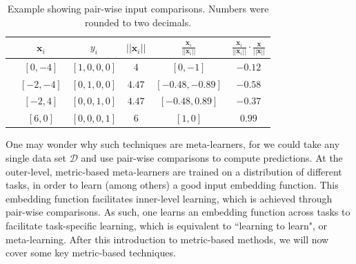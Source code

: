 \begin{table}[tb]
    \centering
    \begin{tabular}{cccccc}
    \toprule
         & $\boldsymbol{x}_{i}$ & $y_{i}$ & $||\boldsymbol{x}_{i}||$ & $\frac{\boldsymbol{x}_{i}}{||\boldsymbol{x}_{i}||}$ & $\frac{\boldsymbol{x}_{i}}{||\boldsymbol{x}_{i}||} \cdot \frac{\boldsymbol{x}}{||\boldsymbol{x}||}$\\
         \midrule
         & $[0,-4]$ & $[1,0,0,0]$ & $4$ & $[0,-1]$ & $-0.12$\\
         & $[-2,-4]$ & $[0,1,0,0]$ &$4.47$ & $[-0.48,-0.89]$ & $-0.58$\\
         & $[-2,4]$ & $[0,0,1,0]$ & $4.47$ & $[-0.48,0.89]$ & $-0.37$\\
         & $[6,0]$ & $[0,0,0,1]$& $6$ & $[1,0]$& $0.99$ \\
         \bottomrule
    \end{tabular}
    \caption{Example showing pair-wise input comparisons. Numbers were rounded to two decimals.}
    \label{tab:exampleMetric}
\end{table}
One may wonder why such techniques are meta-learners, for we could take any single data set $\mathcal{D}$ and use pair-wise comparisons to compute predictions. 
At the outer-level, metric-based meta-learners are trained on a distribution of different tasks, in order to learn (among others) a good input embedding function. 
This embedding function facilitates inner-level learning, which is achieved through pair-wise comparisons. 
As such, one learns an embedding function across tasks to facilitate task-specific learning, which is equivalent to ``learning to learn", or meta-learning.  
After this introduction to metric-based methods, we will now cover some key metric-based techniques.

